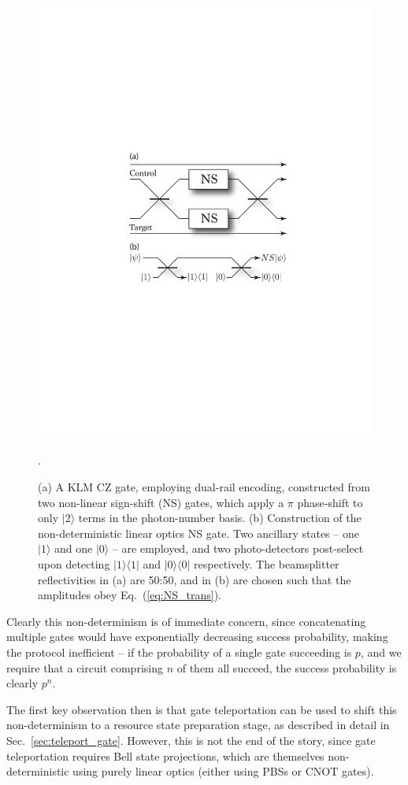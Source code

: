 \documentclass[aps,rmp,twocolumn,amsmath,amssymb,nofootinbib,superscriptaddress,longbibliography,floatfix,table-of-contents,eqsecnum]{revtex4-1}
\newcommand{\bra}[1]{\langle#1|}
\newcommand{\ket}[1]{|#1\rangle}
\begin{document}
\begin{figure}[!htb]
\includegraphics[width=0.8\columnwidth]{KLM_gate}
\caption{(a) A KLM CZ gate, employing dual-rail encoding, constructed from two non-linear sign-shift (NS) gates, which apply a $\pi$ phase-shift to only $\ket{2}$ terms in the photon-number basis. (b) Construction of the non-deterministic linear optics NS gate. Two ancillary states -- one $\ket{1}$ and one $\ket{0}$ -- are employed, and two photo-detectors post-select upon detecting $\ket{1}\bra{1}$ and $\ket{0}\bra{0}$ respectively. The beamsplitter reflectivities in (a) are 50:50, and in (b) are chosen such that the amplitudes obey Eq.~(\ref{eq:NS_trans}).}. \label{fig:KLM_gate}
\end{figure}

Clearly this non-determinism is of immediate concern, since concatenating multiple gates would have exponentially decreasing success probability, making the protocol inefficient -- if the probability of a single gate succeeding is $p$, and we require that a circuit comprising $n$ of them all succeed, the success probability is clearly $p^n$.

The first key observation then is that gate teleportation can be used to shift this non-determinism to a resource state preparation stage, as described in detail in Sec.~\ref{sec:teleport_gate}. However, this is not the end of the story, since gate teleportation requires Bell state projections, which are themselves non-deterministic using purely linear optics (either using PBSs or CNOT gates).
\end{document}
